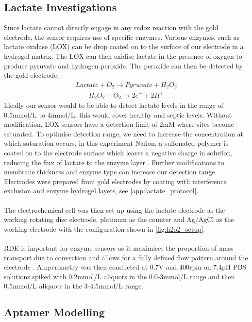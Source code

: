 \subsection{Lactate Investigations}
Since lactate cannot directly engage in any redox reaction with the gold electrode, the sensor requires use of specific enzymes. Various enzymes, such as lactate oxidase (LOX) can be drop coated on to the surface of our electrode in a hydrogel matrix. The LOX can then oxidise lactate in the presence of oxygen to produce pyruvate and hydrogen peroxide. The peroxide can then be detected by the gold electrode.
\begin{align}
    Lactate + O_{2}  \xrightarrow{} Pyruvate + H_{2}O_{2}
\end{align}
\begin{align}
    H_{2}O_{2} + O_{2}  \xrightarrow{} 2e^{-}+2H^{+}
\end{align}
Ideally our sensor would to be able to detect lactate levels in the range of 0.5mmol/L to 4mmol/L, this would cover healthy and septic levels. Without modification, LOX sensors have a detection limit of 2mM where sites become saturated. To optimise detection range, we need to increase the concentration at which saturation occurs, in this experiment Nafion, a sulfonated polymer is coated on to the electrode surface which leaves a negative charge in solution, reducing the flux of lactate to the enzyme layer\cite{rathee2016biosensors} \cite{romero2010amperometric}. Further modifications to membrane thickness and enzyme type can increase our detection range. Electrodes were prepared from gold electrodes by coating with interference exclusion and enzyme hydrogel layers, see \autoref{app:lactate_protocol}.\\\\
The electrochemical cell was then set up using the lactate electrode as the working rotating disc electrode, platinum as the counter and Ag/AgCl as the working electrode with the configuration shown in \autoref{fig:h2o2_setup}.\\\\
RDE is important for enzyme sensors as it maximises the proportion of mass transport due to convection and allows for a fully defined flow pattern around the electrode \cite{nikolic2000theoretical}. Amperometry was then conducted at 0.7V and 400rpm on 7.4pH PBS solutions spiked with 0.2mmol/L aliquots in the 0.0-3mmol/L range and then 0.5mmol/L aliquots in the 3-4.5mmol/L range. \subsection{Aptamer Modelling}
